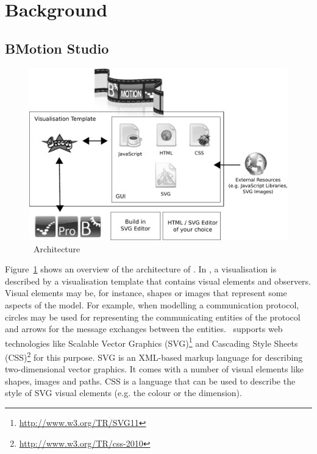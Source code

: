 \documentclass[twoside,10pt]{book}
\begin{document}
\section{Background}

\subsection{BMotion Studio}

\begin{figure}[!ht]
\begin{center}
	\includegraphics[width=14cm]{img/tutorial/bms_architecture}
	\caption{\bms~Architecture}
	\label{fig_tut_00_architecture}
\end{center}
\end{figure}

Figure~\ref{fig_tut_00_architecture} shows an overview of the architecture of \bms. 
In \bms, a visualisation is described by a visualisation template that contains visual elements and observers. 
Visual elements may be, for instance, shapes or images that represent some aspects of the model. 
For example, when modelling a communication protocol, circles may be used for representing the communicating entities of the protocol and arrows for the message exchanges between the entities. 
\bms~supports web technologies like Scalable Vector Graphics (SVG)\footnote{\url{http://www.w3.org/TR/SVG11}} and Cascading Style Sheets (CSS)\footnote{\url{http://www.w3.org/TR/css-2010}} for this purpose. 
SVG is an XML-based markup language for describing two-dimensional vector graphics. 
It comes with a number of visual elements like shapes, images and paths.
CSS is a language that can be used to describe the style of SVG visual elements (e.g. the colour or the dimension). 
\end{document}
